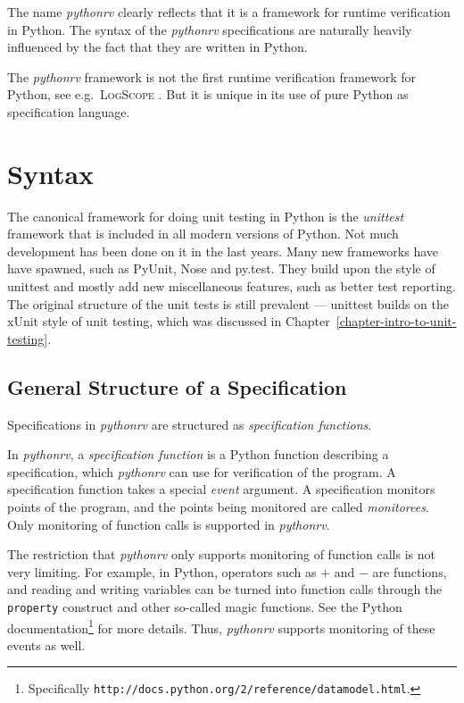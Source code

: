 The name \textit{pythonrv} clearly reflects that it is a framework for runtime
verification in Python. The syntax of the \textit{pythonrv} specifications are
naturally heavily influenced by the fact that they are written in Python.

The \textit{pythonrv} framework is not the first runtime verification framework
for Python, see e.g.\ \textsc{LogScope} \cite{barringer09tutorial}. But it is
  unique in its use of pure Python as specification language.


\section{Syntax} \label{section-approach-syntax}

The canonical framework for doing unit testing in Python is the
\textit{unittest} framework that is included in all modern versions of Python.
Not much development has been done on it in the last years. Many new frameworks
have have spawned, such as PyUnit, Nose and py.test. They build upon the style
of unittest and mostly add new miscellaneous features, such as better test
reporting. The original structure of the unit tests is still prevalent ---
unittest builds on the xUnit style of unit testing, which was discussed in
Chapter~\ref{chapter-intro-to-unit-testing}.

\subsection{General Structure of a Specification}

Specifications in \textit{pythonrv} are structured as \textit{specification
functions}.

\begin{mydef}\label{def-specification-function}
In \textit{pythonrv}, a \textit{specification function} is a Python function
describing a specification, which \textit{pythonrv} can use for verification of
the program. A specification function takes a special \textit{event} argument.
A specification monitors points of the program, and the points being monitored
are called \textit{monitorees}. Only monitoring of function calls is supported
in \textit{pythonrv}.
\end{mydef}

The restriction that \textit{pythonrv} only supports monitoring of function
calls is not very limiting. For example, in Python, operators such as $+$
and $-$ are functions, and reading and writing variables can be turned into
function calls through the \texttt{property} construct and other so-called magic
functions. See the Python documentation\footnote{Specifically
\texttt{http://docs.python.org/2/reference/datamodel.html}.} for more details.
Thus, \textit{pythonrv} supports monitoring of these events as well.

